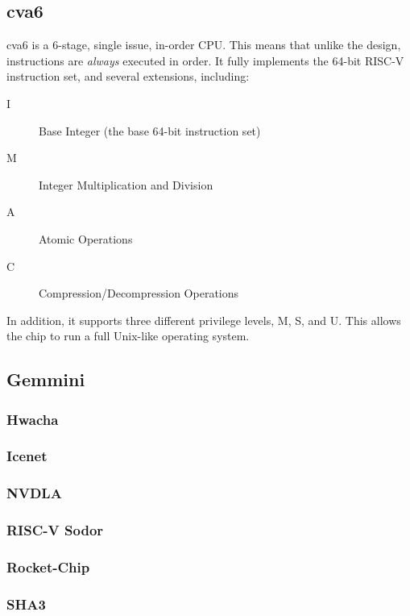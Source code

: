 \subsection{cva6}\label{sec:cva6_Generator}
\nocite{cva6Github}
\nocite{zaruba2019cost}
cva6 is a 6-stage, single issue, in-order CPU.\@
This means that unlike the  design, instructions are \emph{always} executed in order.
It fully implements the 64-bit RISC-V instruction set, and several extensions, including:
\begin{description}
\item[I] Base Integer (the base 64-bit instruction set)
\item[M] Integer Multiplication and Division
\item[A] Atomic Operations
\item[C] Compression/Decompression Operations
\end{description}
In addition, it supports three different privilege levels, M, S, and U.
This allows the chip to run a full Unix-like operating system.

\subsection{Gemmini}\label{sec:Gemmini_Generator}
\nocite{gemminiGithub}
\nocite{gemminiPaper}

\subsubsection{Hwacha}\label{sec:Hwacha}
\subsubsection{Icenet}\label{sec:Icenet_Generator}
\subsubsection{NVDLA}\label{sec:NVDLA_Generator}
\subsubsection{RISC-V Sodor}\label{sec:RISC-V_Sodor}
\subsubsection{Rocket-Chip}\label{sec:Rocket_Chip}
\subsubsection{SHA3}\label{sec:SHA3_Accelerators_Generator}
